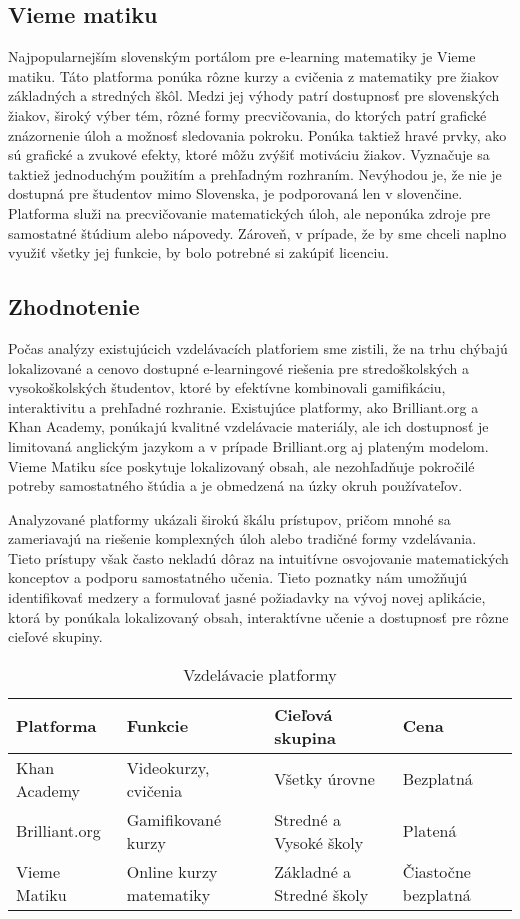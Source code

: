 \subsection{Vieme matiku}
Najpopularnejším slovenským portálom pre e-learning matematiky je Vieme matiku.
Táto platforma ponúka rôzne kurzy a cvičenia z matematiky pre žiakov základných a stredných škôl.
Medzi jej výhody patrí dostupnosť pre slovenských žiakov, široký výber tém, rôzné formy precvičovania,
do ktorých patrí grafické znázornenie úloh a možnosť sledovania pokroku.
Ponúka taktiež hravé prvky, ako sú grafické a zvukové efekty, ktoré môžu zvýšiť motiváciu žiakov.
Vyznačuje sa taktiež jednoduchým použitím a prehľadným rozhraním.
Nevýhodou je, že nie je dostupná pre študentov mimo Slovenska, je podporovaná len v slovenčine.
Platforma služi na precvičovanie matematických úloh, ale neponúka zdroje pre samostatné štúdium alebo nápovedy. 
Zároveň, v prípade, že by sme chceli naplno využiť všetky jej funkcie, by bolo potrebné si zakúpiť licenciu. \cite{viemeto}
\subsection{Zhodnotenie}
Počas analýzy existujúcich vzdelávacích platforiem sme zistili, že na trhu chýbajú lokalizované a cenovo dostupné e-learningové riešenia pre stredoškolských a vysokoškolských študentov, ktoré by efektívne kombinovali gamifikáciu, interaktivitu a prehľadné rozhranie. Existujúce platformy, ako Brilliant.org a Khan Academy, ponúkajú kvalitné vzdelávacie materiály, ale ich dostupnosť je limitovaná anglickým jazykom a v prípade Brilliant.org aj plateným modelom. Vieme Matiku síce poskytuje lokalizovaný obsah, ale nezohľadňuje pokročilé potreby samostatného štúdia a je obmedzená na úzky okruh používateľov.

Analyzované platformy ukázali širokú škálu prístupov, pričom mnohé sa zameriavajú na riešenie komplexných úloh alebo tradičné formy vzdelávania. Tieto prístupy však často nekladú dôraz na intuitívne osvojovanie matematických konceptov a podporu samostatného učenia. Tieto poznatky nám umožňujú identifikovať medzery a formulovať jasné požiadavky na vývoj novej aplikácie, ktorá by ponúkala lokalizovaný obsah, interaktívne učenie a dostupnosť pre rôzne cieľové skupiny.
\begin{table}[htbp]
\caption{Vzdelávacie platformy}
\label{vzdelavaciePlatformy}
\begin{tabularx}{\textwidth}{|X|X|X|X|}
\hline
\textbf{Platforma} & \textbf{Funkcie} & \textbf{Cieľová skupina} & \textbf{Cena} \\ \hline
Khan Academy & Videokurzy, cvičenia & Všetky úrovne & Bezplatná \\ \hline
Brilliant.org & Gamifikované kurzy & Stredné a Vysoké školy & Platená \\ \hline
Vieme Matiku & Online kurzy matematiky & Základné a Stredné školy & Čiastočne bezplatná \\ \hline
\end{tabularx}
\end{table}

